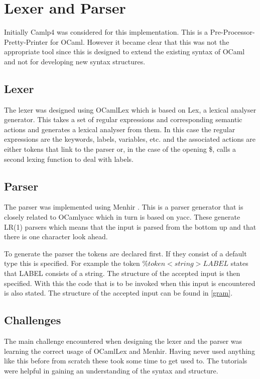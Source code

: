 \section{Lexer and Parser}

Initially Camlp4 \cite{camlp4} was considered for this implementation. This is a Pre-Processor-Pretty-Printer for OCaml. However it became clear that this was not the appropriate tool since this is designed to extend the existing syntax of OCaml and not for developing new syntax structures. 

\subsection{Lexer}
The lexer was designed using OCamlLex which is based on Lex, a lexical analyser generator. This takes a set of regular expressions and corresponding semantic actions and generates a lexical analyser from them. In this case the regular expressions are the keywords, labels, variables, etc. and the associated actions are either tokens that link to the parser or, in the case of the opening \$, calls a second lexing function to deal with labels. 

\subsection{Parser}
The parser was implemented using Menhir \cite{menhirRef}. This is a parser generator that is closely related to OCamlyacc which in turn is based on yacc. These generate LR(1) parsers which means that the input is parsed from the bottom up and that there is one character look ahead. 

To generate the parser the tokens are declared first. If they consist of a default type this is specified. For example the token $\%token <string> LABEL$ states that LABEL consists of a string. The structure of the accepted input is then specified. With this the code that is to be invoked when this input is encountered is also stated. The structure of the accepted input can be found in \ref{gram}.

\subsection{Challenges}
The main challenge encountered when designing the lexer and the parser was learning the correct usage of OCamlLex and Menhir. Having never used anything like this before from scratch these took some time to get used to. The tutorials \cite{miniOcaml}\cite{miniOcaml}\cite{menhirBlog}\cite[Chapter 16]{realOcaml} were helpful in gaining an understanding of the syntax and structure. 

